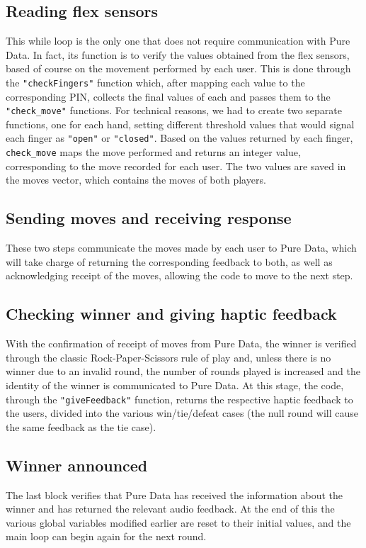\documentclass[11pt,a4paper]{report}
\begin{document}
\subsection*{Reading flex sensors}
This while loop is the only one that does not require communication with Pure Data. In fact, its function is to verify the values obtained from the flex sensors, based of course on the movement performed by each user.
This is done through the \texttt{"checkFingers"} function which, after mapping each value to the corresponding PIN, collects the final values of each and passes them to the \texttt{"check\_move"} functions. For technical reasons, we had to create two separate functions, one for each hand, setting different threshold values that would signal each finger as \texttt{"open"} or \texttt{"closed"}. Based on the values returned by each finger, \texttt{check\_move} maps the move performed and returns an integer value, corresponding to the move recorded for each user. The two values are saved in the moves vector, which contains the moves of both players.

\subsection*{Sending moves and receiving response}
These two steps communicate the moves made by each user to Pure Data, which will take charge of returning the corresponding feedback to both, as well as acknowledging receipt of the moves, allowing the code to move to the next step.

\subsection*{Checking winner and giving haptic feedback}
With the confirmation of receipt of moves from Pure Data, the winner is verified through the classic Rock-Paper-Scissors rule of play and, unless there is no winner due to an invalid round, the number of rounds played is increased and the identity of the winner is communicated to Pure Data.
At this stage, the code, through the \texttt{"giveFeedback"} function, returns the respective haptic feedback to the users, divided into the various win/tie/defeat cases (the null round will cause the same feedback as the tie case).
\subsection*{Winner announced}
The last block verifies that Pure Data has received the information about the winner and has returned the relevant audio feedback. At the end of this the various global variables modified earlier are reset to their initial values, and the main loop can begin again for the next round.
\end{document}
